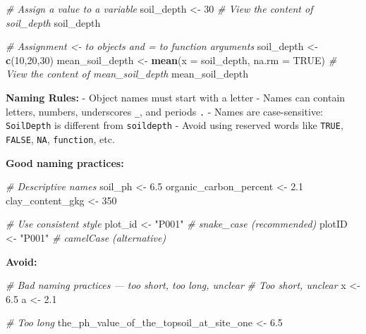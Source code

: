 \documentclass[
  10pt,
  b5paper,
  oneside]{book}
\newenvironment{Shaded}{\begin{snugshade}}{\end{snugshade}}
\newcommand{\AttributeTok}[1]{\textcolor[rgb]{0.13,0.29,0.53}{#1}}
\newcommand{\CommentTok}[1]{\textcolor[rgb]{0.56,0.35,0.01}{\textit{#1}}}
\newcommand{\ConstantTok}[1]{\textcolor[rgb]{0.56,0.35,0.01}{#1}}
\newcommand{\DecValTok}[1]{\textcolor[rgb]{0.00,0.00,0.81}{#1}}
\newcommand{\FloatTok}[1]{\textcolor[rgb]{0.00,0.00,0.81}{#1}}
\newcommand{\FunctionTok}[1]{\textcolor[rgb]{0.13,0.29,0.53}{\textbf{#1}}}
\newcommand{\NormalTok}[1]{#1}
\newcommand{\OtherTok}[1]{\textcolor[rgb]{0.56,0.35,0.01}{#1}}
\newcommand{\StringTok}[1]{\textcolor[rgb]{0.31,0.60,0.02}{#1}}
\begin{document}
\begin{Shaded}
\begin{Highlighting}[]
\CommentTok{\# Assign a value to a variable}
\NormalTok{soil\_depth }\OtherTok{\textless{}{-}} \DecValTok{30}
\CommentTok{\# View the content of soil\_depth}
\NormalTok{soil\_depth}

\CommentTok{\# Assignment \textasciigrave{}\textless{}{-}\textasciigrave{} to objects and \textasciigrave{}=\textasciigrave{} to function arguments}
\NormalTok{soil\_depth }\OtherTok{\textless{}{-}} \FunctionTok{c}\NormalTok{(}\DecValTok{10}\NormalTok{,}\DecValTok{20}\NormalTok{,}\DecValTok{30}\NormalTok{)}
\NormalTok{mean\_soil\_depth }\OtherTok{\textless{}{-}} \FunctionTok{mean}\NormalTok{(}\AttributeTok{x =}\NormalTok{ soil\_depth, }\AttributeTok{na.rm =} \ConstantTok{TRUE}\NormalTok{)}
\CommentTok{\# View the content of mean\_soil\_depth}
\NormalTok{mean\_soil\_depth}
\end{Highlighting}
\end{Shaded}

\textbf{Naming Rules:}
- Object names must start with a letter
- Names can contain letters, numbers, underscores \texttt{\_}, and periods \texttt{.}
- Names are case-sensitive: \texttt{SoilDepth} is different from \texttt{soildepth}
- Avoid using reserved words like \texttt{TRUE}, \texttt{FALSE}, \texttt{NA}, \texttt{function}, etc.

\textbf{Good naming practices:}

\begin{Shaded}
\begin{Highlighting}[]
\CommentTok{\# Descriptive names}
\NormalTok{soil\_ph }\OtherTok{\textless{}{-}} \FloatTok{6.5}
\NormalTok{organic\_carbon\_percent }\OtherTok{\textless{}{-}} \FloatTok{2.1}
\NormalTok{clay\_content\_gkg }\OtherTok{\textless{}{-}} \DecValTok{350}

\CommentTok{\# Use consistent style}
\NormalTok{plot\_id }\OtherTok{\textless{}{-}} \StringTok{"P001"}      \CommentTok{\# snake\_case (recommended)}
\NormalTok{plotID }\OtherTok{\textless{}{-}} \StringTok{"P001"}       \CommentTok{\# camelCase (alternative)}
\end{Highlighting}
\end{Shaded}

\textbf{Avoid:}

\begin{Shaded}
\begin{Highlighting}[]
\CommentTok{\# Bad naming practices — too short, too long, unclear}
\CommentTok{\# Too short, unclear}
\NormalTok{x }\OtherTok{\textless{}{-}} \FloatTok{6.5}
\NormalTok{a }\OtherTok{\textless{}{-}} \FloatTok{2.1}

\CommentTok{\# Too long}
\NormalTok{the\_ph\_value\_of\_the\_topsoil\_at\_site\_one }\OtherTok{\textless{}{-}} \FloatTok{6.5}
\end{Highlighting}
\end{Shaded}
\end{document}
